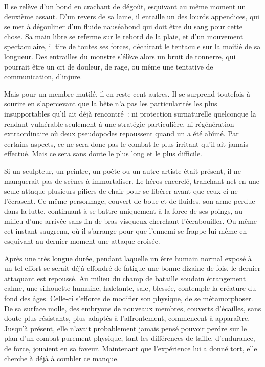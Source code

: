 \documentclass{report}
\begin{document}
Il se relève d'un bond en crachant de dégoût, esquivant au même moment un deuxième assaut. D'un revers de sa lame, il entaille un des lourds appendices, qui se met à dégouliner d'un fluide nauséabond qui doit être du sang pour cette chose. Sa main libre se referme sur le rebord de la plaie, et d'un mouvement spectaculaire, il tire de toutes ses forces, déchirant le tentacule sur la moitié de sa longueur. Des entrailles du monstre s'élève alors un bruit de tonnerre, qui pourrait être un cri de douleur, de rage, ou même une tentative de communication, d'injure.

Mais pour un membre mutilé, il en reste cent autres. Il se surprend toutefois à sourire en s'apercevant que la bête n'a pas les particularités les plus insupportables qu'il ait déjà rencontré : ni protection surnaturelle quelconque la rendant vulnérable seulement à une stratégie particulière, ni régénération extraordinaire où  deux pseudopodes repoussent quand un a été abîmé. Par certains aspects, ce ne sera donc pas le combat le plus irritant qu'il ait jamais effectué. Mais ce sera sans doute le plus long et le plus difficile.

Si un sculpteur, un peintre, un poète ou un autre artiste était présent, il ne manquerait pas de scènes à immortaliser. Le héros encerclé, tranchant net en une seule attaque plusieurs piliers de chair pour se libérer avant que ceux-ci ne l'écrasent. Ce même personnage, couvert de boue et de fluides, son arme perdue dans la lutte, continuant à se battre uniquement à la force de ses poings, au milieu d'une arrivée sans fin de bras visqueux cherchant l'écrabouiller. Ou même cet instant saugrenu, où il s'arrange pour que l'ennemi se frappe lui-même en esquivant au dernier moment une attaque croisée.

Après une très longue durée, pendant laquelle un être humain normal exposé à un tel effort se serait déjà effondré de fatigue une bonne dizaine de fois, le dernier attaquant est repoussé. Au milieu du champ de bataille soudain étrangement calme, une silhouette humaine, haletante, sale, blessée, contemple la créature du fond des âges. Celle-ci s'efforce de modifier son physique, de se métamorphoser. De sa surface molle, des embryons de nouveaux membres, couverts d'écailles, sans doute plus résistants, plus adaptés à l'affrontement, commencent à apparaître. Jusqu'à présent, elle n'avait probablement jamais pensé pouvoir perdre sur le plan d'un combat purement physique, tant les différences de taille, d'endurance, de force, jouaient en sa faveur. Maintenant que l'expérience lui a donné tort, elle cherche à déjà à combler ce manque.
\end{document}
